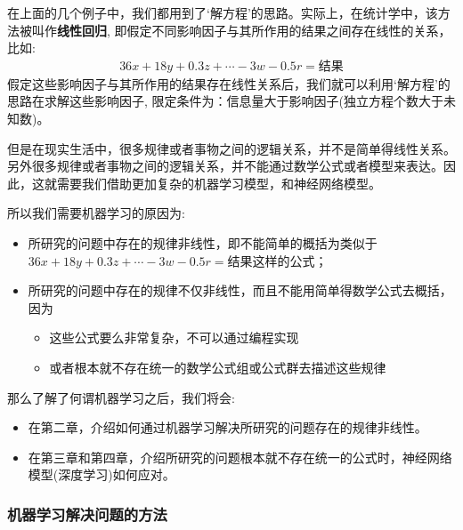 \documentclass[12pt]{article}
\numberwithin{figure}{section}
\newenvironment{fullmodel}{
			\smallskip\noindent
			\begin{minipage}{\textwidth+\marginparwidth+\marginparsep}\smallskip\smallskip}
			{\smallskip\smallskip\end{minipage}\vspace{.1in}
			}
\numberwithin{equation}{section}
\begin{document}
\begin{fullmodel}
	\begin{tcolorbox}[title={从线性回归到机器学习}]
		在上面的几个例子中，我们都用到了`解方程'的思路。实际上，在统计学中，该方法被叫作\textbf{线性回归}, 即假定不同影响因子与其所作用的结果之间存在线性的关系，比如:
		\begin{align*}
			36x + 18y + 0.3 z + \cdots -3w - 0.5 r = \text{结果} 
		\end{align*}
		假定这些影响因子与其所作用的结果存在线性关系后，我们就可以利用`解方程'的思路在求解这些影响因子, 限定条件为：信息量大于影响因子(独立方程个数大于未知数)。
		
		但是在现实生活中，很多规律或者事物之间的逻辑关系，并不是简单得线性关系。另外很多规律或者事物之间的逻辑关系，并不能通过数学公式或者模型来表达。因此，这就需要我们借助更加复杂的机器学习模型，和神经网络模型。
		
		所以我们需要机器学习的原因为:
		\begin{itemize}
			\item 所研究的问题中存在的规律非线性，即不能简单的概括为类似于$36x + 18y + 0.3 z + \cdots -3w - 0.5 r = \text{结果} $这样的公式；
			\item 所研究的问题中存在的规律不仅非线性，而且不能用简单得数学公式去概括，因为
			\begin{itemize}
			\item 这些公式要么非常复杂，不可以通过编程实现
			\item 或者根本就不存在统一的数学公式组或公式群去描述这些规律
			\end{itemize}
		\end{itemize}
	\end{tcolorbox}
\end{fullmodel}

那么了解了何谓机器学习之后，我们将会:
\begin{itemize}
	\item 在第二章，介绍如何通过机器学习解决所研究的问题存在的规律非线性。
	\item 在第三章和第四章，介绍所研究的问题根本就不存在统一的公式时，神经网络模型(深度学习)如何应对。
\end{itemize}

\subsubsection{机器学习解决问题的方法}
\end{document}

